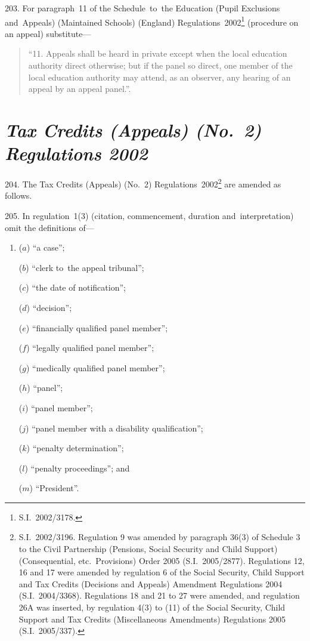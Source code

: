 \documentclass[12pt,a4paper]{article}
\begin{document}
203.  For paragraph~11 of the Schedule~to~the Education (Pupil Exclusions and~Appeals) (Maintained Schools) (England) Regulations~2002\footnote{S.I.~2002/3178.} (procedure on an appeal) substitute—
\begin{quotation}
“11.  Appeals shall be heard in private except when the local education authority direct otherwise; but if the panel so direct, one member of the local education authority may attend, as an observer, any hearing of an appeal by an appeal panel.”.
\end{quotation}

\section*{\itshape\sloppy Tax Credits (Appeals) (No.~2) Regulations 2002}

204.  The Tax Credits (Appeals) (No.~2) Regulations~2002\footnote{S.I.~2002/3196. Regulation 9 was amended by paragraph 36(3) of Schedule 3 to the Civil Partnership (Pensions, Social Security and Child Support) (Consequential, etc.\ Provisions) Order 2005 (S.I.~2005/2877). Regulations 12, 16 and 17 were amended by regulation 6 of the Social Security, Child Support and Tax Credits (Decisions and Appeals) Amendment Regulations 2004 (S.I.~2004/3368). Regulations 18 and 21 to 27 were amended, and regulation 26A was inserted, by regulation 4(3) to (11) of the Social Security, Child Support and Tax Credits (Miscellaneous Amendments) Regulations 2005 (S.I.~2005/337).} are amended as follows.

\medskip

205.  In regulation~1(3) (citation, commencement, duration and~interpretation) omit the definitions of—
\begin{enumerate}\item[]
($a$) “a case”;

($b$) “clerk to~the appeal tribunal”;

($c$) “the date of notification”;

($d$) “decision”;

($e$) “financially qualified panel member”;

($f$) “legally qualified panel member”;

($g$) “medically qualified panel member”;

($h$) “panel”;

($i$) “panel member”;

($j$) “panel member with a disability qualification”;

($k$) “penalty determination”;

($l$) “penalty proceedings”; and

($m$) “President”.
\end{enumerate}
\end{document}
